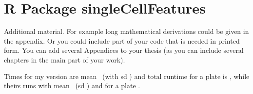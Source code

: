 \chapter{R Package singleCellFeatures}
\label{app:singleCellFeatures}

Additional material. For example long mathematical derivations could be
given in the appendix. Or you could include part of your code that is
needed in printed form. You can add several Appendices to your thesis (as
you can include several chapters in the main part of your work).







Times for my version are mean \knitrScfBenchmarkFacetMean\ (with sd \knitrScfBenchmarkFacetSd) and total runtime for a plate is \knitrScfBenchmarkFacetTotal, while theirs runs with mean \knitrScfBenchmarkEdgeMean\ (sd \knitrScfBenchmarkEdgeSd) and for a plate \knitrScfBenchmarkEdgeTotal.